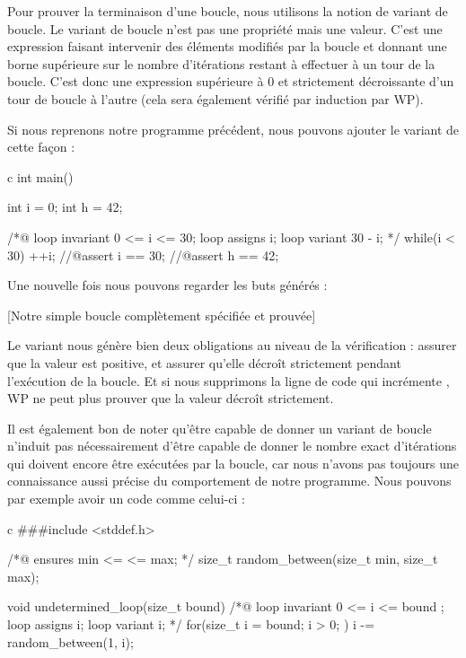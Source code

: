 Pour prouver la terminaison d'une boucle, nous utilisons la notion de variant de 
boucle. Le variant de boucle n'est pas une propriété mais une valeur. C'est une 
expression faisant intervenir des éléments modifiés par la boucle et donnant une
borne supérieure sur le nombre d'itérations restant à effectuer à un tour de la
boucle. C'est donc une expression supérieure à 0 et strictement décroissante d'un 
tour de boucle à l'autre (cela sera également vérifié par induction par WP).



Si nous reprenons notre programme précédent, nous pouvons ajouter le variant
de cette façon :



\begin{CodeBlock}{c}
int main(){
  int i = 0;
  int h = 42;
  
  /*@
    loop invariant 0 <= i <= 30;
    loop assigns i;
    loop variant 30 - i;
  */
  while(i < 30){
    ++i;
  }
  //@assert i == 30;
  //@assert h == 42;
}
\end{CodeBlock}



Une nouvelle fois nous pouvons regarder les buts générés :



[Notre simple boucle complètement spécifiée et prouvée]


Le variant nous génère bien deux obligations au niveau de la vérification : 
assurer que la valeur est positive, et assurer qu'elle décroît strictement pendant
l'exécution de la boucle. Et si nous supprimons la ligne de code qui incrémente
, WP ne peut plus prouver que la valeur  décroît strictement.



Il est également bon de noter qu'être capable de donner un variant de boucle
n'induit pas nécessairement d'être capable de donner le nombre exact d'itérations
qui doivent encore être exécutées par la boucle, car nous n'avons pas toujours une
connaissance aussi précise du comportement de notre programme. Nous pouvons par
 exemple avoir un code comme celui-ci :



\begin{CodeBlock}{c}
###include <stddef.h>

/*@
  ensures min <= \result <= max;
*/
size_t random_between(size_t min, size_t max);

void undetermined_loop(size_t bound){
  /*@
    loop invariant 0 <= i <= bound ;
    loop assigns i;
    loop variant i;
   */
  for(size_t i = bound; i > 0; ){
    i -= random_between(1, i);
  }
}
\end{CodeBlock}



